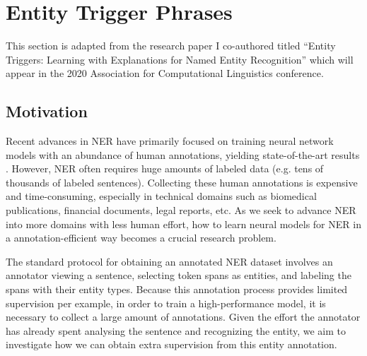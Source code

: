 \chapter{Entity Trigger Phrases}
This section is adapted from the research paper I co-authored titled ``Entity Triggers: Learning with Explanations for Named Entity Recognition'' which will appear in the 2020 Association for Computational Linguistics conference.



\section{Motivation}
\label{sec:intro}
Recent advances in NER have primarily focused on training neural network models with an abundance of human annotations, yielding state-of-the-art results \cite{LampleNER}. However, NER often requires huge amounts of labeled data (e.g. tens of thousands of labeled sentences). Collecting these human annotations is expensive and time-consuming, especially in technical domains such as biomedical publications, financial documents, legal reports, etc. As we seek to advance NER into more domains with less human effort, how to learn neural models for NER in a annotation-efficient way becomes a crucial research problem.

The standard protocol for obtaining an annotated NER dataset involves an annotator viewing a sentence, selecting token spans as entities, and labeling the spans with their entity types. Because this annotation process provides limited supervision per example, in order to train a high-performance model, it is necessary to collect a large amount of annotations. Given the effort the annotator has already spent analysing the sentence and recognizing the entity, we aim to investigate how we can obtain extra supervision from this entity annotation.

